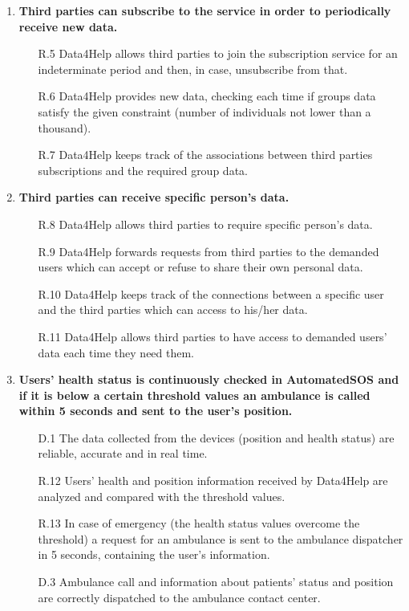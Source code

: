 \documentclass[a4paper]{article}
\begin{document}
\begin{enumerate}[label*=\bf{G.\arabic*}]
            
        \item \textbf{Third parties can subscribe to the service in order to periodically receive new data.}
        
        \begin{enumerate}
            \item [R.5] Data4Help allows third parties to join the subscription service for an indeterminate period and then, in case, unsubscribe from that.
            \item [R.6] Data4Help provides new data, checking each time if groups data satisfy the given constraint (number of individuals not lower than a thousand).
            \item [R.7] Data4Help keeps track of the associations between third parties subscriptions and the required group data.
        \end{enumerate}
        
        
        \item \textbf{Third parties can receive specific person's data.}
                
        \begin{enumerate}
            \item[R.8] Data4Help allows third parties to require specific person's data. 
            \item [R.9] Data4Help forwards requests from third parties to the demanded users which can accept or refuse to share their own personal data.
            \item [R.10] Data4Help keeps track of the connections between a specific user and the third parties which can access to his/her data.
            \item [R.11] Data4Help allows third parties to have access to demanded users' data each time they need them.
        \end{enumerate}
                
            
        \item \textbf{Users' health status is continuously checked in AutomatedSOS and if it is below a certain threshold values an ambulance is called within 5 seconds and sent to the user's position.}
    
        \begin{enumerate}
            \item [D.1] The data collected from the devices (position and health status) are reliable, accurate and in real time.
            \item [R.12] Users' health and position information received by Data4Help are analyzed and compared with the threshold values.
            \item [R.13] In case of emergency (the health status values overcome the threshold) a request for an ambulance is sent to the ambulance dispatcher in 5 seconds, containing the user's information.
            \item [D.3] Ambulance call and information about patients' status and position are correctly dispatched to the ambulance contact center.
        \end{enumerate}
        

\end{enumerate}
\end{document}

